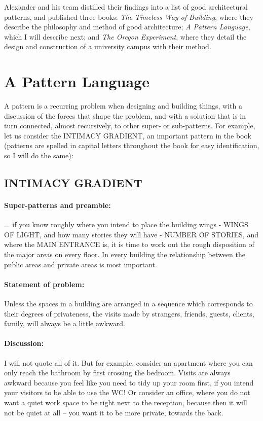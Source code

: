 Alexander and his team distilled their findings into a list of good
architectural patterns, and published three books: \textit{The Timeless Way of
Building}, where they describe the philosophy and method of good architecture;
\textit{A Pattern Language}, which I will describe next; and \textit{The Oregon
Experiment}, where they detail the design and construction of a university
campus with their method.

\section*{A Pattern Language}

A pattern is a recurring problem when designing and building things, with a
discussion of the forces that shape the problem, and with a solution that is in
turn connected, almost recursively, to other super- or sub-patterns. For
example, let us consider the INTIMACY GRADIENT, an important pattern in the book
(patterns are spelled in capital letters throughout the book for easy
identification, so I will do the same):

\subsection*{INTIMACY GRADIENT}

\paragraph*{Super-patterns and preamble:}
... if you know roughly where you intend to place the building wings - WINGS OF
LIGHT, and how many stories they will have - NUMBER OF STORIES, and where the
MAIN ENTRANCE is, it is time to work out the rough disposition of the major
areas on every floor. In every building the relationship between the public
areas and private areas is most important.

\paragraph*{Statement of problem:}
Unless the spaces in a building are arranged in a sequence which corresponds to
their degrees of privateness, the visits made by strangers, friends, guests,
clients, family, will always be a little awkward.

\paragraph*{Discussion:}
I will not quote all of it. But for example, consider an apartment where you can
only reach the bathroom by first crossing the bedroom. Visits are always awkward
because you feel like you need to tidy up your room first, if you intend your
visitors to be able to use the WC! Or consider an office, where you do not want
a quiet work space to be right next to the reception, because then it will not
be quiet at all -- you want it to be more private, towards the back.

